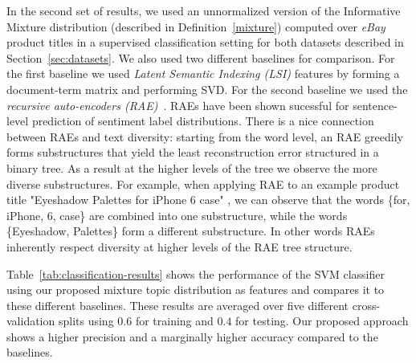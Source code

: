 In the second set of results, we used an unnormalized version of the Informative Mixture
distribution (described in Definition~\ref{mixture}) computed over
{\em eBay} product titles in a supervised classification
setting for both datasets described in Section~\ref{sec:datasets}. We also used two 
different baselines for comparison. For the first baseline we used {\em Latent Semantic Indexing (LSI)} features by forming a
document-term matrix and performing SVD. For the second baseline we used the {\em recursive auto-encoders (RAE)}~\cite{Socher:2011:SRA:2145432.2145450}. RAEs 
have been shown sucessful for sentence-level prediction of sentiment label
distributions. There is a nice connection between RAEs and text diversity: starting from the word level, an RAE greedily forms substructures that yield the least reconstruction error  structured in a  binary tree. As a result at the higher levels of the tree we observe the more diverse  substructures. For example, when applying RAE to an example product title "Eyeshadow Palettes for
iPhone 6 case" , we can observe that the words \{for, iPhone, 6, case\} are combined into one substructure, while the words \{Eyeshadow, Palettes\} form a different substructure. In other words RAEs inherently respect diversity at higher levels of the RAE tree structure.

Table~\ref{tab:classification-results} shows
the performance of the SVM classifier using our proposed mixture topic
distribution as features and compares it to these different baselines.
These results are averaged over five different cross-validation splits using $0.6$ for training
and $0.4$ for testing. Our proposed approach shows a higher precision
and a marginally higher accuracy compared to the baselines.
